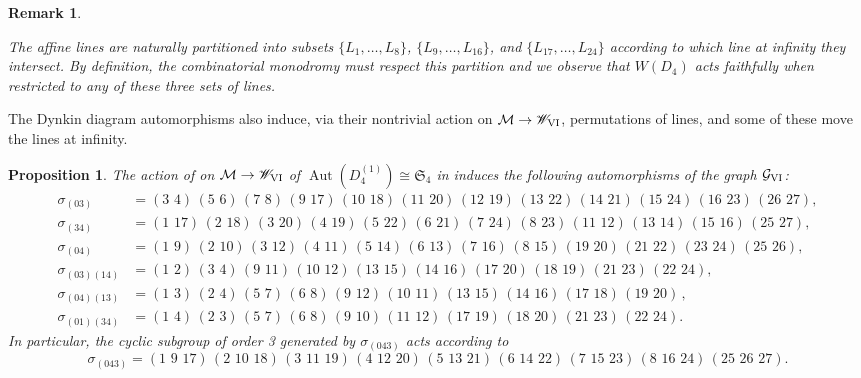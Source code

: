 \documentclass[a4paper,reqno]{amsart}
\numberwithin{equation}{section}
\DeclareMathOperator{\Aut}{Aut}
\newtheorem{proposition}[theorem]{Proposition}
\newtheorem{remark}[theorem]{Remark}
\numberwithin{equation}{section}
\begin{document}
\begin{remark} \label{rem:combinatorialremarkPVI}
    
    The affine lines are naturally partitioned into subsets $\{L_1,
    \dots, L_8\}$, $\{L_9,
    \dots, L_{16}\}$, and $\{L_{17},
    \dots, L_{24}\}$ according to which line at infinity they intersect.  
    By definition, the combinatorial monodromy must respect this partition and
    we observe that $W(D_4)$ acts faithfully when restricted to any of these three sets of lines.
\end{remark}


The Dynkin diagram automorphisms also induce, via their nontrivial action on $\mathcal{M}\to\mathscr{W}_{\rm{VI}}$, permutations of lines, and some of these move the lines at infinity.
\begin{proposition}
    The action of on $\mathcal{M}\to \mathscr{W}_{\rm{VI}}$ of $\Aut(D_4^{(1)})\cong \mathfrak{S}_4$ in  induces the following automorphisms of the graph $\mathcal{G}_{\rm{VI}}$:
\begin{align*}
	\sigma_{(03)}&= (3\,\, 4)\,(5\,\, 6)\,(7\,\, 8)\,(9\,\, 17)\,(10\,\, 18)\,(11\,\, 20)\,(12\,\, 19)\,(13\,\, 22)\,(14\,\, 21)\,(15\,\, 24)\,(16\,\, 23)\,(26\,\,27),\\
	\sigma_{(34)}&=(1\,\, 17)\,(2\,\, 18)\,(3\,\, 20)\,(4\,\, 19)\,(5\,\, 22)\,(6\,\, 21)\,(7\,\, 24)\,(8\,\, 23)\,(11\,\, 12)\,(13\,\, 14)\,(15\,\, 16)\,(25\,\,27),\\
	\sigma_{(04)}&=(1\,\, 9)\,(2\,\, 10)\,(3\,\, 12)\,(4\,\, 11)\,(5\,\, 14)\,(6\,\, 13)\,(7\,\, 16)\,(8\,\, 15)\,(19\,\, 20)\,(21\,\, 22)\,(23\,\, 24)\,(25\,\,26),\\
	\sigma_{(03)(14)}&=(1\,\, 2)\,(3\,\, 4)\,(9\,\, 11)\,(10\,\, 12)\,(13\,\, 15)\,(14\,\, 16)\,(17\,\, 20)\,(18\,\, 19)\,(21\,\, 23)\,(22\,\, 24),\\
	\sigma_{(04)(13)}&=(1\,\, 3)\,(2\,\, 4)\,(5\,\, 7)\,(6\,\, 8)\,(9\,\, 12)\,(10\,\, 11)\,(13\,\, 15)\,(14\,\, 16)\,(17\,\, 18)\,(19\,\, 20)\,,\\
	\sigma_{(01)(34)}&=(1\,\, 4)\,(2\,\, 3)\,(5\,\, 7)\,(6\,\, 8)\,(9\,\, 10)\,(11\,\, 12)\,(17\,\, 19)\,(18\,\, 20)\,(21\,\, 23)\,(22\,\, 24).
\end{align*}
In particular, the cyclic subgroup of order 3 generated by $\sigma_{(043)}$ acts according to 
$$\sigma_{(043)}=(1\,\,9\,\, 17)\,(2\,\,10\,\, 18)\,(3\,\,11\,\, 19)\,(4\,\,12\,\, 20)\,(5\,\,13\,\, 21)\,(6\,\,14\,\, 22)\,(7\,\,15\,\, 23)\,(8\,\,16\,\, 24)\,( 25\,\,26\,\,27).$$



\end{proposition}
\end{document}
